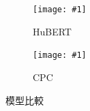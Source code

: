 {{}

{

\newcommand{\jeffheightt}[1]{\texttt{[image: \#1]}}

\begin{figure}
     \centering
     \begin{subfigure}{\textwidth}  %
         \centering
         \jeffheightt{figures/hubert-50-joint-byprob--new1.png}
         \caption{HuBERT}
         \label{fig:ch3-heatmap-model--hubert-50-joint-byprob}
     \end{subfigure}
     \vfill

     \begin{subfigure}{\textwidth}  %
         \centering
         \jeffheightt{figures/cpc-50-joint-byprob.png}
         \caption{CPC}
         \label{fig:ch3-heatmap-model--cpc-50-joint-byprob}
     \end{subfigure}

     \caption{模型比較}
     \label{fig:ch3-heatmap-model-comparison--part1}
\end{figure}


\begin{figure}
    \ContinuedFloat
     \centering
     

\end{figure}}}
